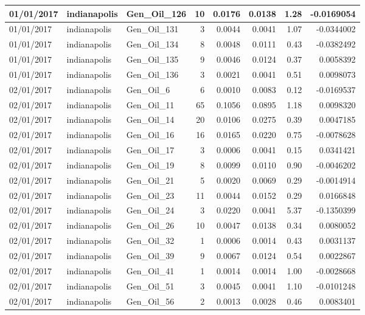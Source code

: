 \documentclass[
  letterpaper,
  DIV=11,
  numbers=noendperiod]{scrartcl}
\begin{document}
\begin{tabular}{l|l|l|r|r|r|r|r}
\hline
01/01/2017 & indianapolis & Gen\_Oil\_126 & 10 & 0.0176 & 0.0138 & 1.28 & -0.0169054\\
\hline
01/01/2017 & indianapolis & Gen\_Oil\_131 & 3 & 0.0044 & 0.0041 & 1.07 & -0.0344002\\
\hline
01/01/2017 & indianapolis & Gen\_Oil\_134 & 8 & 0.0048 & 0.0111 & 0.43 & -0.0382492\\
\hline
01/01/2017 & indianapolis & Gen\_Oil\_135 & 9 & 0.0046 & 0.0124 & 0.37 & 0.0058392\\
\hline
01/01/2017 & indianapolis & Gen\_Oil\_136 & 3 & 0.0021 & 0.0041 & 0.51 & 0.0098073\\
\hline
02/01/2017 & indianapolis & Gen\_Oil\_6 & 6 & 0.0010 & 0.0083 & 0.12 & -0.0169537\\
\hline
02/01/2017 & indianapolis & Gen\_Oil\_11 & 65 & 0.1056 & 0.0895 & 1.18 & 0.0098320\\
\hline
02/01/2017 & indianapolis & Gen\_Oil\_14 & 20 & 0.0106 & 0.0275 & 0.39 & 0.0047185\\
\hline
02/01/2017 & indianapolis & Gen\_Oil\_16 & 16 & 0.0165 & 0.0220 & 0.75 & -0.0078628\\
\hline
02/01/2017 & indianapolis & Gen\_Oil\_17 & 3 & 0.0006 & 0.0041 & 0.15 & 0.0341421\\
\hline
02/01/2017 & indianapolis & Gen\_Oil\_19 & 8 & 0.0099 & 0.0110 & 0.90 & -0.0046202\\
\hline
02/01/2017 & indianapolis & Gen\_Oil\_21 & 5 & 0.0020 & 0.0069 & 0.29 & -0.0014914\\
\hline
02/01/2017 & indianapolis & Gen\_Oil\_23 & 11 & 0.0044 & 0.0152 & 0.29 & 0.0166848\\
\hline
02/01/2017 & indianapolis & Gen\_Oil\_24 & 3 & 0.0220 & 0.0041 & 5.37 & -0.1350399\\
\hline
02/01/2017 & indianapolis & Gen\_Oil\_26 & 10 & 0.0047 & 0.0138 & 0.34 & 0.0080052\\
\hline
02/01/2017 & indianapolis & Gen\_Oil\_32 & 1 & 0.0006 & 0.0014 & 0.43 & 0.0031137\\
\hline
02/01/2017 & indianapolis & Gen\_Oil\_39 & 9 & 0.0067 & 0.0124 & 0.54 & 0.0022867\\
\hline
02/01/2017 & indianapolis & Gen\_Oil\_41 & 1 & 0.0014 & 0.0014 & 1.00 & -0.0028668\\
\hline
02/01/2017 & indianapolis & Gen\_Oil\_51 & 3 & 0.0045 & 0.0041 & 1.10 & -0.0101248\\
\hline
02/01/2017 & indianapolis & Gen\_Oil\_56 & 2 & 0.0013 & 0.0028 & 0.46 & 0.0083401\\

\end{tabular}
\end{document}
